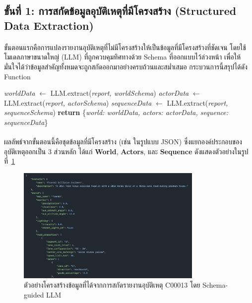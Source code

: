 \subsection{ขั้นที่ 1: การสกัดข้อมูลอุบัติเหตุที่มีโครงสร้าง (Structured Data Extraction)}\label{subsec:ch4_data_extraction}
\paragraph{}
ขั้นตอนแรกคือการแปลงรายงานอุบัติเหตุที่ไม่มีโครงสร้างให้เป็นข้อมูลที่มีโครงสร้างที่ชัดเจน โดยใช้โมเดลภาษาขนาดใหญ่ (LLM) ที่ถูกควบคุมทิศทางด้วย Schema ที่ออกแบบไว้ล่วงหน้า เพื่อให้มั่นใจได้ว่าข้อมูลสำคัญทั้งหมดจะถูกสกัดออกมาอย่างครบถ้วนและสม่ำเสมอ กระบวนการนี้สรุปได้ดัง Function 

\begin{algorithmic}[1]
    \State \textit{worldData} $\gets$ LLM.extract(\textit{report, worldSchema})
    \State \textit{actorData} $\gets$ LLM.extract(\textit{report, actorSchema})
    \State \textit{sequenceData} $\gets$ LLM.extract(\textit{report, sequenceSchema})
    \State \textbf{return} \{\textit{world: worldData, actors: actorData, sequence: sequenceData}\}
\EndFunction
\end{algorithmic}

\paragraph{}
ผลลัพธ์จากขั้นตอนนี้คือชุดข้อมูลที่มีโครงสร้าง (เช่น ในรูปแบบ JSON) ซึ่งแยกองค์ประกอบของอุบัติเหตุออกเป็น 3 ส่วนหลัก ได้แก่ \textbf{World}, \textbf{Actors}, และ \textbf{Sequence} ดังแสดงตัวอย่างในรูปที่~\ref{fig:ch4_extracted_data}

\begin{figure}[htbp]
    \centering
    \includegraphics[width=0.8\textwidth]{images/kg-extracted-data-example}
    \caption{ตัวอย่างโครงสร้างข้อมูลที่ได้จากการสกัดรายงานอุบัติเหตุ C00013 โดย Schema-guided LLM}
    \label{fig:ch4_extracted_data}
\end{figure}

